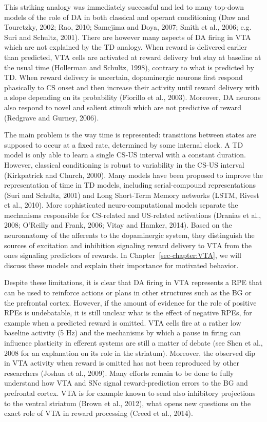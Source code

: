 \documentclass[
  11pt,
  a4paper,
]{scrbook}
\begin{document}
This striking analogy was immediately successful and led to many
top-down models of the role of DA in both classical and operant
conditioning (Daw and Touretzky, 2002; Rao, 2010; Samejima and Doya,
2007; Smith et al., 2006; e.g. Suri and Schultz, 2001). There are
however many aspects of DA firing in VTA which are not explained by the
TD analogy. When reward is delivered earlier than predicted, VTA cells
are activated at reward delivery but stay at baseline at the usual time
(Hollerman and Schultz, 1998), contrary to what is predicted by TD. When
reward delivery is uncertain, dopaminergic neurons first respond
phasically to CS onset and then increase their activity until reward
delivery with a slope depending on its probability (Fiorillo et al.,
2003). Moreover, DA neurons also respond to novel and salient stimuli
which are not predictive of reward (Redgrave and Gurney, 2006).

The main problem is the way time is represented: transitions between
states are supposed to occur at a fixed rate, determined by some
internal clock. A TD model is only able to learn a single CS-US interval
with a constant duration. However, classical conditioning is robust to
variability in the CS-US interval (Kirkpatrick and Church, 2000). Many
models have been proposed to improve the representation of time in TD
models, including serial-compound representations (Suri and Schultz,
2001) and Long Short-Term Memory networks (LSTM, Rivest et al., 2010).
More sophisticated neuro-computational models separate the mechanisms
responsible for CS-related and US-related activations (Dranias et al.,
2008; O'Reilly and Frank, 2006; Vitay and Hamker, 2014). Based on the
neuroanatomy of the afferents to the dopaminergic system, they
distinguish the sources of excitation and inhibition signaling reward
delivery to VTA from the ones signaling predictors of rewards. In
Chapter~\ref{sec-chapter:VTA}, we will discuss these models and explain
their importance for motivated behavior.

Despite these limitations, it is clear that DA firing in VTA represents
a RPE that can be used to reinforce actions or plans in other structures
such as the BG or the prefrontal cortex. However, if the amount of
evidence for the role of positive RPEs is undebatable, it is still
unclear what is the effect of negative RPEs, for example when a
predicted reward is omitted. VTA cells fire at a rather low baseline
activity (5 Hz) and the mechanisms by which a pause in firing can
influence plasticity in efferent systems are still a matter of debate
(see Shen et al., 2008 for an explanation on its role in the striatum).
Moreover, the observed dip in VTA activity when reward is omitted has
not been reproduced by other researchers (Joshua et al., 2009). Many
efforts remain to be done to fully understand how VTA and SNc signal
reward-prediction errors to the BG and prefrontal cortex. VTA is for
example known to send also inhibitory projections to the ventral
striatum (Brown et al., 2012), what opens new questions on the exact
role of VTA in reward processing (Creed et al., 2014).
\end{document}
